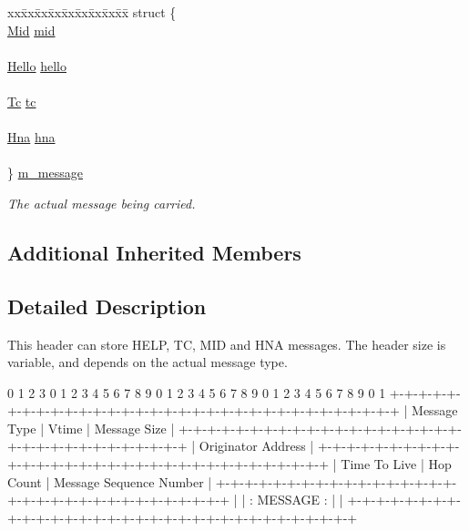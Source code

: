 \begin{DoxyCompactItemize}
\begin{tabbing}
xx\=xx\=xx\=xx\=xx\=xx\=xx\=xx\=xx\=\kill
struct \{\\
\>\hyperlink{structns3_1_1olsr_1_1MessageHeader_1_1Mid}{Mid} \hyperlink{classns3_1_1olsr_1_1MessageHeader_a0009ae1f66c6b8a878564e2053eff3cb}{mid}\\
\>\\
\>\hyperlink{structns3_1_1olsr_1_1MessageHeader_1_1Hello}{Hello} \hyperlink{classns3_1_1olsr_1_1MessageHeader_a6040af69f6f6c66412e715d149d46d53}{hello}\\
\>\\
\>\hyperlink{structns3_1_1olsr_1_1MessageHeader_1_1Tc}{Tc} \hyperlink{classns3_1_1olsr_1_1MessageHeader_a8f66e54e1c5bdbcc753d53cbc079a324}{tc}\\
\>\\
\>\hyperlink{structns3_1_1olsr_1_1MessageHeader_1_1Hna}{Hna} \hyperlink{classns3_1_1olsr_1_1MessageHeader_a7515b4b2db90cc1ce1affe1b666d3195}{hna}\\
\>\\
\} \hyperlink{classns3_1_1olsr_1_1MessageHeader_a5150b6b6822c808597f55f13025646f5}{m\_message}\\

\end{tabbing}\begin{DoxyCompactList}\small\item\em The actual message being carried. \end{DoxyCompactList}\end{DoxyCompactItemize}
\subsection*{Additional Inherited Members}


\subsection{Detailed Description}
This header can store H\+E\+LP, TC, M\+ID and H\+NA messages. The header size is variable, and depends on the actual message type.

\begin{DoxyVerb}  0                   1                   2                   3
  0 1 2 3 4 5 6 7 8 9 0 1 2 3 4 5 6 7 8 9 0 1 2 3 4 5 6 7 8 9 0 1
 +-+-+-+-+-+-+-+-+-+-+-+-+-+-+-+-+-+-+-+-+-+-+-+-+-+-+-+-+-+-+-+-+
 |  Message Type |     Vtime     |         Message Size          |
 +-+-+-+-+-+-+-+-+-+-+-+-+-+-+-+-+-+-+-+-+-+-+-+-+-+-+-+-+-+-+-+-+
 |                      Originator Address                       |
 +-+-+-+-+-+-+-+-+-+-+-+-+-+-+-+-+-+-+-+-+-+-+-+-+-+-+-+-+-+-+-+-+
 |  Time To Live |   Hop Count   |    Message Sequence Number    |
 +-+-+-+-+-+-+-+-+-+-+-+-+-+-+-+-+-+-+-+-+-+-+-+-+-+-+-+-+-+-+-+-+
 |                                                               |
 :                            MESSAGE                            :
 |                                                               |
 +-+-+-+-+-+-+-+-+-+-+-+-+-+-+-+-+-+-+-+-+-+-+-+-+-+-+-+-+-+-+-+-+
\end{DoxyVerb}
 

